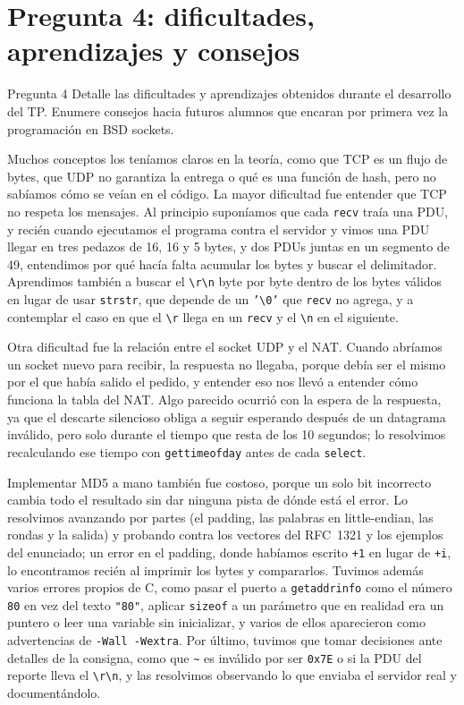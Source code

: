 \documentclass[11pt,a4paper]{article}
\newcommand{\code}[1]{\texttt{#1}}
\newcommand{\crlf}{\code{\textbackslash r\textbackslash n}}
\begin{document}
\section{Pregunta 4: dificultades, aprendizajes y consejos}

\begin{pregunta}{Pregunta 4}
Detalle las dificultades y aprendizajes obtenidos durante el desarrollo del TP. Enumere consejos hacia futuros alumnos que encaran por primera vez la programación en BSD sockets.
\end{pregunta}

Muchos conceptos los teníamos claros en la teoría, como que TCP es un flujo de bytes, que UDP no garantiza la entrega o qué es una función de hash, pero no sabíamos cómo se veían en el código. La mayor dificultad fue entender que TCP no respeta los mensajes. Al principio suponíamos que cada \code{recv} traía una PDU, y recién cuando ejecutamos el programa contra el servidor y vimos una PDU llegar en tres pedazos de 16, 16 y 5 bytes, y dos PDUs juntas en un segmento de 49, entendimos por qué hacía falta acumular los bytes y buscar el delimitador. Aprendimos también a buscar el \crlf{} byte por byte dentro de los bytes válidos en lugar de usar \code{strstr}, que depende de un \code{'\textbackslash 0'} que \code{recv} no agrega, y a contemplar el caso en que el \code{\textbackslash r} llega en un \code{recv} y el \code{\textbackslash n} en el siguiente.

Otra dificultad fue la relación entre el socket UDP y el NAT. Cuando abríamos un socket nuevo para recibir, la respuesta no llegaba, porque debía ser el mismo por el que había salido el pedido, y entender eso nos llevó a entender cómo funciona la tabla del NAT. Algo parecido ocurrió con la espera de la respuesta, ya que el descarte silencioso obliga a seguir esperando después de un datagrama inválido, pero solo durante el tiempo que resta de los 10 segundos; lo resolvimos recalculando ese tiempo con \code{gettimeofday} antes de cada \code{select}.

Implementar MD5 a mano también fue costoso, porque un solo bit incorrecto cambia todo el resultado sin dar ninguna pista de dónde está el error. Lo resolvimos avanzando por partes (el padding, las palabras en little-endian, las rondas y la salida) y probando contra los vectores del RFC~1321 y los ejemplos del enunciado; un error en el padding, donde habíamos escrito \code{+1} en lugar de \code{+i}, lo encontramos recién al imprimir los bytes y compararlos. Tuvimos además varios errores propios de C, como pasar el puerto a \code{getaddrinfo} como el número \code{80} en vez del texto \code{"80"}, aplicar \code{sizeof} a un parámetro que en realidad era un puntero o leer una variable sin inicializar, y varios de ellos aparecieron como advertencias de \code{-Wall -Wextra}. Por último, tuvimos que tomar decisiones ante detalles de la consigna, como que \code{\textasciitilde} es inválido por ser \code{0x7E} o si la PDU del reporte lleva el \crlf, y las resolvimos observando lo que enviaba el servidor real y documentándolo.
\end{document}
